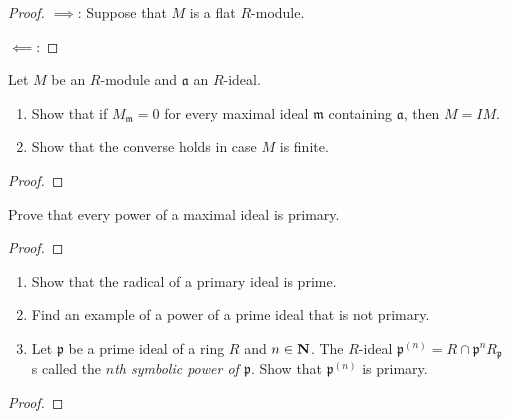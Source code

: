 \begin{proof}
$\implies$: Suppose that $M$ is a flat $R$-module.

$\impliedby$:
\end{proof}
\newpage
\begin{problem}
Let $M$ be an $R$-module and $\mathfrak{a}$ an $R$-ideal.
\begin{enumerate}[noitemsep,label=(\alph*)]
\item Show that if $M_{\mathfrak{m}}=0$ for every maximal ideal
  $\mathfrak{m}$ containing $\mathfrak{a}$, then $M=IM$.
\item Show that the converse holds in case $M$ is finite.
\end{enumerate}
\end{problem}
\begin{proof}
\end{proof}
\newpage
\begin{problem}
Prove that every power of a maximal ideal is primary.
\end{problem}
\begin{proof}
\end{proof}
\newpage
\begin{problem}
\begin{enumerate}[noitemsep,label=(\alph*)]
\item Show that the radical of a primary ideal is prime.
\item Find an example of a power of a prime ideal that is not
  primary.
\item Let $\mathfrak{p}$ be a prime ideal of a ring $R$ and
  $n\in\mathbf{N}$. The $R$-ideal
  $\mathfrak{p}^{(n)}=R\cap\mathfrak{p}^nR_{\mathfrak{p}}$ s
  called the \emph{$n$th symbolic power of $\mathfrak{p}$}. Show
  that $\mathfrak{p}^{(n)}$ is primary.
\end{enumerate}
\end{problem}
\begin{proof}
\end{proof}

